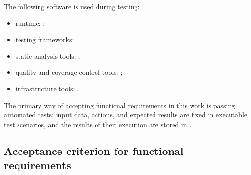 \documentclass[12pt,a4paper]{extarticle}
\begin{document}
\begin{hseExample}
The following software is used during testing:

\begin{itemize}[leftmargin=1.25cm]
    \item runtime: ;
    \item testing frameworks: ;
    \item static analysis tools: ;
    \item quality and coverage control tools: ;
    \item infrastructure tools: .
\end{itemize}

The primary way of accepting functional requirements in this work is passing automated tests: input data, actions, and expected results are fixed in executable test scenarios, and the results of their execution are stored in .
\end{hseExample}

\subsection{Acceptance criterion for functional requirements}
\end{document}
